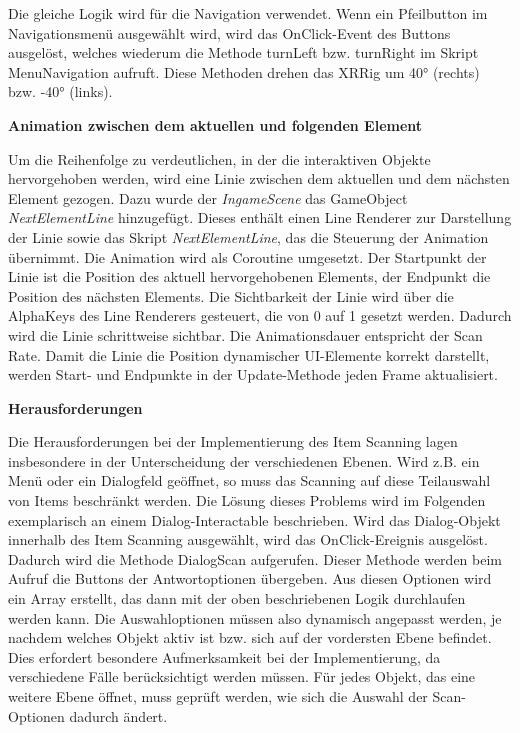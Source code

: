 Die gleiche Logik wird für die Navigation verwendet. Wenn ein Pfeilbutton im Navigationsmenü ausgewählt wird, wird das OnClick-Event des Buttons ausgelöst, welches wiederum die Methode turnLeft bzw. turnRight im Skript MenuNavigation aufruft. Diese Methoden drehen das XRRig um 40° (rechts) bzw. -40° (links).

\textbf{Animation zwischen dem aktuellen und folgenden Element}

Um die Reihenfolge zu verdeutlichen, in der die interaktiven Objekte hervorgehoben werden, wird eine Linie zwischen dem aktuellen und dem nächsten Element gezogen. Dazu wurde der \textit{IngameScene} das GameObject \textit{NextElementLine} hinzugefügt. Dieses enthält einen Line Renderer zur Darstellung der Linie sowie das Skript \textit{NextElementLine}, das die Steuerung der Animation übernimmt.
Die Animation wird als Coroutine umgesetzt. Der Startpunkt der Linie ist die Position des aktuell hervorgehobenen Elements, der Endpunkt die Position des nächsten Elements. Die Sichtbarkeit der Linie wird über die AlphaKeys des Line Renderers gesteuert, die von 0 auf 1 gesetzt werden. Dadurch wird die Linie schrittweise sichtbar. Die Animationsdauer entspricht der Scan Rate. Damit die Linie die Position dynamischer UI-Elemente korrekt darstellt, werden Start- und Endpunkte in der Update-Methode jeden Frame aktualisiert.

\textbf{Herausforderungen}

Die Herausforderungen bei der Implementierung des Item Scanning lagen insbesondere in der Unterscheidung der verschiedenen Ebenen. Wird z.B. ein Menü oder ein Dialogfeld geöffnet, so muss das Scanning auf diese Teilauswahl von Items beschränkt werden. Die Lösung dieses Problems wird im Folgenden exemplarisch an einem Dialog-Interactable beschrieben. 
Wird das Dialog-Objekt innerhalb des Item Scanning ausgewählt, wird das OnClick-Ereignis ausgelöst. Dadurch wird die Methode DialogScan aufgerufen. Dieser Methode werden beim Aufruf die Buttons der Antwortoptionen übergeben. Aus diesen Optionen wird ein Array erstellt, das dann mit der oben beschriebenen Logik durchlaufen werden kann. Die Auswahloptionen müssen also dynamisch angepasst werden, je nachdem welches Objekt aktiv ist bzw. sich auf der vordersten Ebene befindet. Dies erfordert besondere Aufmerksamkeit bei der Implementierung, da verschiedene Fälle berücksichtigt werden müssen. Für jedes Objekt, das eine weitere Ebene öffnet, muss geprüft werden, wie sich die Auswahl der Scan-Optionen dadurch ändert. 

